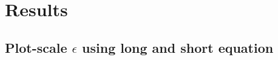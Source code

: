 \documentclass[fleqn,10pt]{wlscirep}
\begin{document}
\section{Results}

\subsection{Plot-scale $\epsilon$ using long and short equation}
\end{document}
